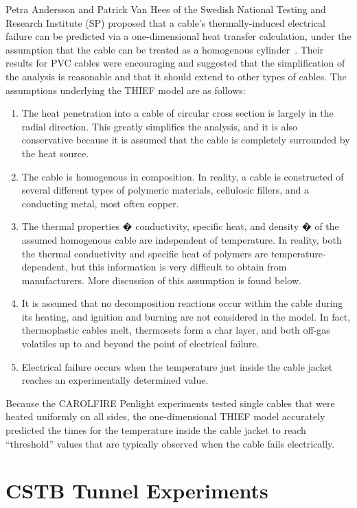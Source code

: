 Petra Andersson and Patrick Van Hees of the Swedish National Testing and Research Institute
(SP) proposed that a cable's thermally-induced electrical failure can be predicted
via a one-dimensional heat transfer calculation, under the assumption that the cable can
be treated as a homogenous cylinder~\cite{Andersson:2005}. Their results for PVC
cables were encouraging and suggested that the simplification of the analysis is reasonable and
that it should extend to other types of cables.
The assumptions underlying the THIEF model are as follows:
\begin{enumerate}
\item The heat penetration into a cable of circular cross section is largely in the radial direction.
This greatly simplifies the analysis, and it is also conservative because it is assumed that
the cable is completely surrounded by the heat source.
\item The cable is homogenous in composition. In reality, a cable is constructed of several
different types of polymeric materials, cellulosic fillers, and a conducting metal, most
often copper.
\item The thermal properties � conductivity, specific heat, and density � of the assumed
homogenous cable are independent of temperature. In reality, both the thermal
conductivity and specific heat of polymers are temperature-dependent, but this
information is very difficult to obtain from manufacturers. More discussion of this
assumption is found below.
\item It is assumed that no decomposition reactions occur within the cable during its heating,
and ignition and burning are not considered in the model. In fact, thermoplastic cables
melt, thermosets form a char layer, and both off-gas volatiles up to and beyond the point
of electrical failure.
\item Electrical failure occurs when the temperature just inside the cable jacket reaches an
experimentally determined value.
\end{enumerate}
Because the CAROLFIRE Penlight experiments tested single cables that were heated uniformly
on all sides, the one-dimensional THIEF model accurately predicted the times for the
temperature inside the cable jacket to reach ``threshold'' values that are typically observed when
the cable fails electrically.


\section{CSTB Tunnel Experiments}

